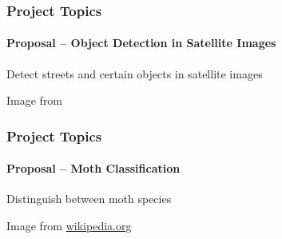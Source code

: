 \documentclass[xetex,professionalfont]{beamer}
\begin{document}

\begin{frame}
\frametitle{Project Topics}
\framesubtitle{Proposal -- Object Detection in Satellite Images}

Detect streets and certain objects in satellite images

\bigskip
\begin{center}
	{\centering Image from \cite{sirmacek2009}}
\end{center}

\end{frame}


\begin{frame}
\frametitle{Project Topics}
\framesubtitle{Proposal -- Moth Classification}

Distinguish between moth species

\bigskip
\begin{center}
	{\centering Image from \url{wikipedia.org}}
\end{center}

\end{frame}

\end{document}
